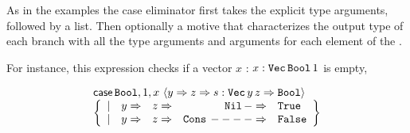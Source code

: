 



As in the examples the case eliminator first takes the explicit type arguments, followed by a \scrut{} list. %
Then optionally a motive that characterizes the output type of each branch with all the type arguments and arguments for each element of the \scruts{}. %

For instance, this \case{} expression checks if a vector $x$ : $x:\mathtt{Vec}{}\,\mathtt{Bool}{}\,1$ is empty,

\[
  \begin{array}{l}
 \mathsf{case}\,\mathtt{Bool}{},1,x\,\left\langle y\Rightarrow z\Rightarrow s:\mathtt{Vec}{}\,y\,z\Rightarrow\mathtt{Bool}{}\right\rangle \\
 \left\{ 
    \begin{array}{rrrrl}
    |&y\Rightarrow& z\Rightarrow& \mathtt{Nil}{}\,-\Rightarrow& \mathtt{True}{} \\
    |&y\Rightarrow& z\Rightarrow& \mathtt{Cons}{}\,----\Rightarrow& \mathtt{False}{}
    \end{array}
    \right\} 
\end{array}
\]

